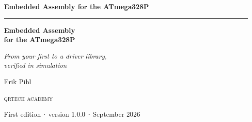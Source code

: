 
\thispagestyle{empty}
\vspace*{2.2in}
\begin{flushright}
  {\Large\bfseries Embedded Assembly for the ATmega328P}
\end{flushright}
\cleardoublepage

\thispagestyle{empty}
\vspace*{1.1in}
\begin{flushleft}
  {\color{accent}\rule{0.9in}{2.5pt}}\par\vspace{1.4ex}
  {\fontsize{32}{38}\selectfont\bfseries Embedded Assembly\\[0.15ex] for the ATmega328P\par}
  \vspace{2.2ex}
  {\Large\itshape From your first  to a driver library,\\verified in simulation\par}
  \vspace{1.2in}
  {\large Erik Pihl\par}
  \vfill
  {\small\scshape\lsstyle qrtech academy\par}
  \vspace{0.6ex}
  {\small\color{muted} First edition\,·\,version 1.0.0\,·\,September 2026\par}
\end{flushleft}
\newpage

